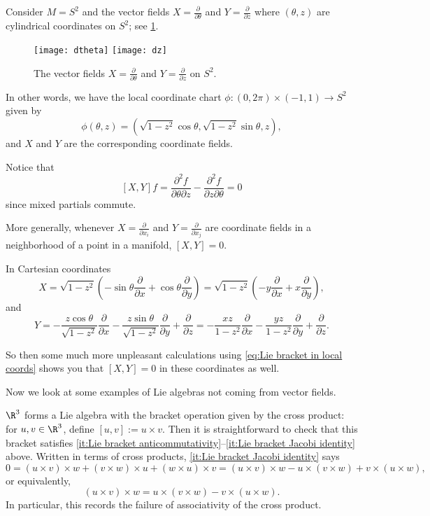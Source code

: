 \begin{example}
	Consider $M = S^2$ and the vector fields $X = \frac{\partial}{\partial \theta}$ and $Y = \frac{\partial}{\partial z}$ where $(\theta,z)$ are cylindrical coordinates on $S^2$; see \cref{fig:dtheta and dz}. 
	
	\begin{figure}[htbp]
		\centering
			\texttt{[image: dtheta]} \qquad \texttt{[image: dz]}
		\caption{The vector fields $X = \frac{\partial}{\partial \theta}$ and $Y = \frac{\partial}{\partial z}$ on $S^2$.}
		\label{fig:dtheta and dz}
	\end{figure}
	
	In other words, we have the local coordinate chart $\phi: (0,2\pi) \times (-1,1) \to S^2$ given by
	\[
		\phi(\theta,z) = (\sqrt{1-z^2} \cos\theta, \sqrt{1-z^2} \sin \theta, z),
	\]
	and $X$ and $Y$ are the corresponding coordinate fields.
	
	Notice that
	\[
		[X,Y]f = \frac{\partial^2 f}{\partial \theta \partial z} - \frac{\partial^2 f}{\partial z \partial \theta} = 0
	\]
	since mixed partials commute.
	
	More generally, whenever $X = \frac{\partial}{\partial x_i}$ and $Y = \frac{\partial}{\partial x_j}$ are coordinate fields in a neighborhood of a point in a manifold, $[X,Y] = 0$.
	
	In Cartesian coordinates
	\[
		X = \sqrt{1-z^2}\left( - \sin \theta \frac{\partial}{\partial x} + \cos \theta \frac{\partial}{\partial y}\right) = \sqrt{1-z^2}\left( - y \frac{\partial}{\partial x} + x \frac{\partial}{\partial y}\right),
	\]
	and
	\[
		Y = -\frac{z \cos\theta}{\sqrt{1-z^2}}\frac{\partial}{\partial x} - \frac{z \sin\theta}{\sqrt{1-z^2}}\frac{\partial}{\partial y} + \frac{\partial}{\partial z} = -\frac{xz}{1-z^2}\frac{\partial}{\partial x} - \frac{yz}{1-z^2}\frac{\partial}{\partial y} + \frac{\partial}{\partial z}.
	\]
	
	So then some much more unpleasant calculations using \eqref{eq:Lie bracket in local coords} shows you that $[X,Y] = 0$ in these coordinates as well.
\end{example}

Now we look at some examples of Lie algebras not coming from vector fields.

\begin{example}
	$\R^3$ forms a Lie algebra with the bracket operation given by the cross product: for $u,v \in \R^3$, define $[u,v] := u \times v$. Then it is straightforward to check that this bracket satisfies \ref{it:Lie bracket anticommutativity}--\ref{it:Lie bracket Jacobi identity} above. Written in terms of cross products, \ref{it:Lie bracket Jacobi identity} says
	\[
		0 = (u \times v) \times w + (v \times w) \times u + (w \times u) \times v = (u \times v) \times w - u \times (v \times w) + v \times (u \times w),
	\]
	or equivalently,
	\[
		(u \times v) \times w = u \times (v \times w) - v \times (u \times w).
	\]
	In particular, this records the failure of associativity of the cross product.
\end{example}

